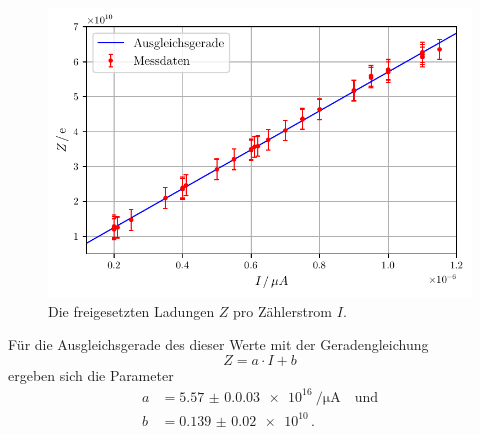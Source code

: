 \begin{figure}[H]
    \centering
    \includegraphics[width = 0.9\linewidth]{build/plot2.pdf}
    \caption{Die freigesetzten Ladungen $Z$ pro Zählerstrom $I$.}
    \label{fig:plot2}
\end{figure}
Für die Ausgleichsgerade des dieser Werte mit der Geradengleichung
\begin{equation*}
    Z = a \cdot I + b 
\end{equation*}
ergeben sich die Parameter
\begin{align*}
    a &= \qty{5.57(0.003)e16}{\per\micro\ampere} \quad \text{und} \\
    b &= \num{0.139(20)e10} \, .
\end{align*}